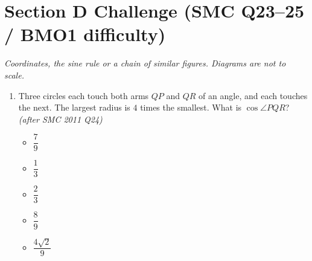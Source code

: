 \documentclass[11pt,a4paper]{article}
\begin{document}
\section*{Section D \quad Challenge \hfill{\normalfont\small(SMC Q23--25 / BMO1 difficulty)}}

\noindent\textit{Coordinates, the sine rule or a chain of similar figures. Diagrams are not to scale.}

\begin{enumerate}

\item \begin{minipage}[t]{0.60\linewidth}
Three circles each touch both arms $QP$ and $QR$ of an angle, and each touches the next. The largest radius is $4$ times the smallest. What is $\cos\angle PQR$? \textit{\small(after SMC 2011 Q24)}
\begin{itemize}[itemsep=3pt]
\item[A)] $\dfrac79$
\item[B)] $\dfrac13$
\item[C)] $\dfrac23$
\item[D)] $\dfrac89$
\item[E)] $\dfrac{4\sqrt2}{9}$
\end{itemize}
\end{minipage}\hfill
\begin{minipage}[t]{0.36\linewidth}
\vspace{0pt}
\centering
{}
\end{minipage}


\end{enumerate}
\end{document}
